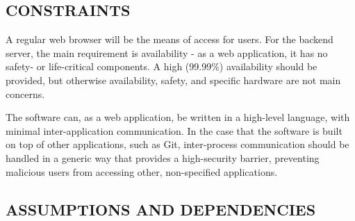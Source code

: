 \documentclass[letterpaper, 10pt, draftclsnofoot, onecolumn]{IEEEtran}
\begin{document}

\subsection[CONSTRAINTS]{\rmfamily\bfseries\color{black}
CONSTRAINTS}

\noindent A regular web browser will be the means of access for users. For the backend
server, the main requirement is availability - as a web application, it has no
safety- or life-critical components. A high (99.99\%) availability should be provided,
but otherwise availability, safety, and specific hardware are not main concerns.

\bigskip

\noindent The software can, as a web application, be written in a high-level language, with
minimal inter-application communication. In the case that the software is built
on top of other applications, such as Git, inter-process communication should be
handled in a generic way that provides a high-security barrier, preventing malicious
users from accessing other, non-specified applications.

\subsection[ASSUMPTIONS AND DEPENDENCIES]{\rmfamily\bfseries\color{black}
ASSUMPTIONS AND DEPENDENCIES}
\end{document}
